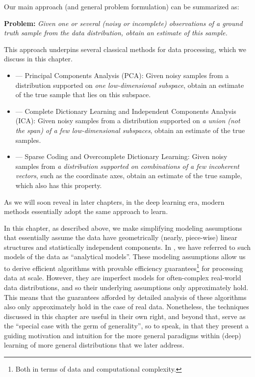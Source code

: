 \documentclass[../../book-main.tex]{subfiles}
\begin{document}
Our main approach (and general problem formulation) can be summarized as:
\begin{tcolorbox}\centering
    \textbf{Problem:} \textit{Given one or several (noisy or incomplete) observations of a ground truth sample from the data distribution, obtain an estimate of this sample.}
\end{tcolorbox}
This approach underpins several classical methods for data processing, which we discuss in this chapter.
\begin{itemize}
    \item {} --- Principal Components Analysis (PCA): Given noisy samples from a distribution supported on {\em one low-dimensional subspace}, obtain an estimate of the true sample that lies on this subspace.
    \item  {} --- Complete Dictionary Learning and Independent Components Analysis (ICA): Given noisy samples from a distribution supported on {\em a union (\textit{not} the span) of a few low-dimensional subspaces}, obtain an estimate of the true samples.
    \item {} --- Sparse Coding and Overcomplete Dictionary Learning: Given noisy samples from {\em a distribution supported on combinations of a few incoherent vectors}, such as the coordinate axes, obtain an estimate of the true sample, which also has this property.
\end{itemize}
As we will soon reveal in later chapters, in the deep learning era, modern methods essentially adopt the same approach to learn.

In this chapter, as described above, we make simplifying modeling assumptions that essentially assume the data have geometrically (nearly, piece-wise) linear structures and statistically independent components. In , we have referred to such models of the data as ``analytical models''. These modeling assumptions allow us to derive efficient algorithms with provable efficiency guarantees\footnote{Both in terms of data and computational complexity.} for processing data at scale. However, they are imperfect models for often-complex real-world data distributions, and so their underlying assumptions only approximately hold. This means that the guarantees afforded by detailed analysis of these algorithms also only approximately hold in the case of real data. Nonetheless, the techniques discussed in this chapter are useful in their own right, and beyond that, serve as the ``special case with the germ of generality'', so to speak, in that they present a guiding motivation and intuition for the more general paradigms within (deep)  learning of more general distributions that we later address. %
\end{document}
